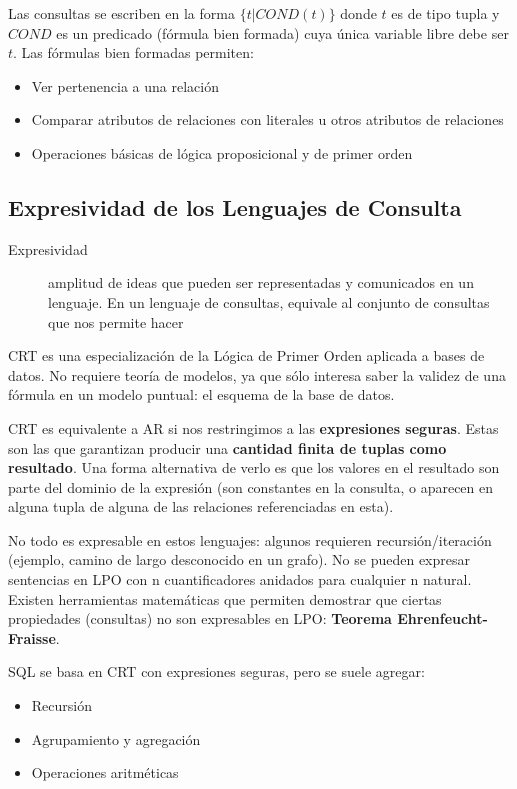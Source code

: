 Las consultas se escriben en la forma $\{t | COND(t)\}$ donde $t$ es de tipo tupla y $COND$ es un predicado (fórmula bien formada) cuya única variable libre debe ser $t$. Las fórmulas bien formadas permiten:

\begin{itemize}
	\item Ver pertenencia a una relación
	\item Comparar atributos de relaciones con literales u otros atributos de relaciones
	\item Operaciones básicas de lógica proposicional y de primer orden
\end{itemize}

\subsection{Expresividad de los Lenguajes de Consulta}

\begin{description}
	\item[Expresividad] amplitud de ideas que pueden ser representadas y comunicados en un lenguaje. En un lenguaje de consultas, equivale al conjunto de consultas que nos permite hacer
\end{description}

CRT es una especialización de la Lógica de Primer Orden aplicada a bases de datos. No requiere teoría de modelos, ya que sólo interesa saber la validez de una fórmula en un modelo puntual: el esquema de la base de datos.

CRT es equivalente a AR si nos restringimos a las \textbf{expresiones seguras}. Estas son las que garantizan producir una \textbf{cantidad finita de tuplas como resultado}. Una forma alternativa de verlo es que los valores en el resultado son parte del dominio de la expresión (son constantes en la consulta, o aparecen en alguna tupla de alguna de las relaciones referenciadas en esta).

No todo es expresable en estos lenguajes: algunos requieren recursión/iteración (ejemplo, camino de largo desconocido en un grafo). No se pueden expresar sentencias en LPO con n cuantificadores anidados para cualquier n natural. Existen herramientas matemáticas que permiten demostrar
que ciertas propiedades (consultas) no son expresables en
LPO: \textbf{Teorema Ehrenfeucht-Fraisse}.

SQL se basa en CRT con expresiones seguras, pero se suele agregar:

\begin{itemize}
	\item Recursión
	\item Agrupamiento y agregación
	\item Operaciones aritméticas
\end{itemize}

